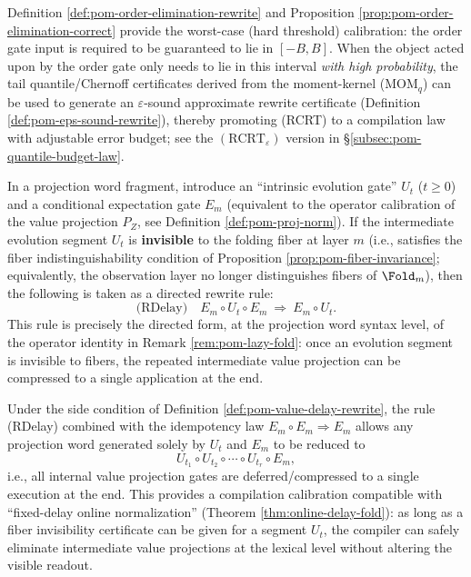 \begin{remark}\label{rem:pom-rcrt-epsilon-pointer}
Definition \ref{def:pom-order-elimination-rewrite} and Proposition \ref{prop:pom-order-elimination-correct} provide the worst-case (hard threshold) calibration: the order gate input is required to be guaranteed to lie in \([-B,B]\).
When the object acted upon by the order gate only needs to lie in this interval \emph{with high probability}, the tail quantile/Chernoff certificates derived from the moment-kernel (\(\mathrm{MOM}_q\)) can be used to generate an \(\varepsilon\)-sound approximate rewrite certificate (Definition \ref{def:pom-eps-sound-rewrite}), thereby promoting (RCRT) to a compilation law with adjustable error budget; see the \((\mathrm{RCRT}_\varepsilon)\) version in \S\ref{subsec:pom-quantile-budget-law}.
\end{remark}

\begin{definition}\label{def:pom-value-delay-rewrite}
In a projection word fragment, introduce an ``intrinsic evolution gate'' \(U_t\) (\(t\ge 0\)) and a conditional expectation gate \(E_m\) (equivalent to the operator calibration of the value projection \(P_Z\), see Definition \ref{def:pom-proj-norm}).
If the intermediate evolution segment \(U_t\) is \textbf{invisible} to the folding fiber at layer \(m\) (i.e., satisfies the fiber indistinguishability condition of Proposition \ref{prop:pom-fiber-invariance}; equivalently, the observation layer no longer distinguishes fibers of \(\Fold_m\)), then the following is taken as a directed rewrite rule:
$$
\text{(RDelay)}\quad
E_m\circ U_t\circ E_m\ \Longrightarrow\ E_m\circ U_t.
$$
This rule is precisely the directed form, at the projection word syntax level, of the operator identity in Remark \ref{rem:pom-lazy-fold}: once an evolution segment is invisible to fibers, the repeated intermediate value projection can be compressed to a single application at the end.
\end{definition}

\begin{remark}\label{rem:pom-value-delay-normal-form}
Under the side condition of Definition \ref{def:pom-value-delay-rewrite}, the rule (RDelay) combined with the idempotency law \(E_m\circ E_m\Rightarrow E_m\) allows any projection word generated solely by \(U_t\) and \(E_m\) to be reduced to
$$
U_{t_1}\circ U_{t_2}\circ\cdots\circ U_{t_r}\circ E_m,
$$
i.e., all internal value projection gates are deferred/compressed to a single execution at the end.
This provides a compilation calibration compatible with ``fixed-delay online normalization'' (Theorem \ref{thm:online-delay-fold}): as long as a fiber invisibility certificate can be given for a segment \(U_t\), the compiler can safely eliminate intermediate value projections at the lexical level without altering the visible readout.
\end{remark}

